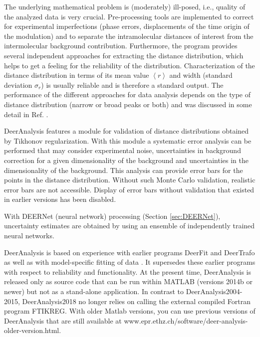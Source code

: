 \documentclass{article}
\begin{document}
The underlying mathematical problem is (moderately) ill-posed, i.e., quality of the analyzed data is very crucial. Pre-processing tools are implemented to correct for experimental imperfections (phase errors, displacements of the time origin of the modulation) and to separate the intramolecular distances of interest from the intermolecular background contribution. Furthermore, the program provides several independent approaches for extracting the distance distribution, which helps to get a feeling for the reliability of the distribution. Characterization of the distance distribution in terms of its mean value $\left\langle r \right\rangle$ and width (standard deviation $\sigma_{r}$) is usually reliable \cite{jeschke2004a} and is therefore a standard output. The performance of the different approaches for data analysis depends on the type of distance distribution (narrow or broad peaks or both) and was discussed in some detail in Ref. \cite{jeschke2004a}.

DeerAnalysis features a module for validation of distance distributions obtained by Tikhonov regularization. With this module a systematic error analysis can be performed that may consider experimental noise, uncertainties in background correction for a given dimensionality of the background and uncertainties in the dimensionality of the background. This analysis can provide error bars for the points in the distance distribution. Without such Monte Carlo validation, realistic error bars are not accessible. Display of error bars without validation that existed in earlier versions has been disabled.

With DEERNet (neural network) processing (Section \ref{sec:DEERNet}), uncertainty estimates are obtained by using an ensemble of independently trained neural networks.

DeerAnalysis is based on experience with earlier programs DeerFit and DeerTrafo as well as with model-specific fitting of data \cite{jeschke2003b,hinderbe2004,godt2006}. It supersedes these earlier programs with respect to reliability and functionality. At the present time, DeerAnalysis is released only as source code that can be run within MATLAB (versions 2014b or newer) but not as a stand-alone application. In contrast to DeerAnalysis2004-2015, DeerAnalysis2018 no longer relies on calling the external compiled Fortran program FTIKREG. With older Matlab versions, you can use previous versions of DeerAnalysis that are still available at www.epr.ethz.ch/software/deer-analysis-older-version.html.
\end{document}
